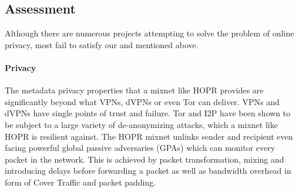 \subsection{Assessment}

Although there are numerous projects attempting to solve the problem of online privacy, most fail to satisfy our  and  mentioned above.

\paragraph{Privacy} The metadata privacy properties that a mixnet like HOPR provides are significantly beyond what VPNs, dVPNs or even Tor can deliver. VPNs and dVPNs have single points of trust and failure. Tor and I2P have been shown to be subject to a large variety of de-anonymizing attacks, which a mixnet like HOPR is resilient against. The HOPR mixnet unlinks sender and recipient even facing powerful global passive adversaries (GPAs) which can monitor every packet in the network. This is achieved by packet transformation, mixing and introducing delays before forwarding a packet as well as bandwidth overhead in form of Cover Traffic and packet padding.

